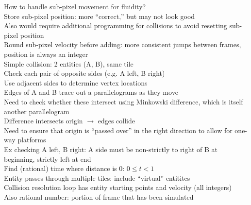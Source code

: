 \documentclass{article}
\begin{document}
How to handle sub-pixel movement for fluidity? \\
Store sub-pixel position: more ``correct,'' but may not look good \\
Also would require additional programming for collisions
to avoid resetting sub-pixel position \\
Round sub-pixel velocity before adding: more consistent jumps between frames,
position is always an integer \\

Simple collision: 2 entities (A, B), same tile \\
Check each pair of opposite sides (e.g. A left, B right) \\
Use adjacent sides to determine vertex locations \\
Edges of A and B trace out a parallelograms as they move \\
Need to check whether these intersect using Minkowski difference,
which is itself another parallelogram \\
Difference intersects origin $\rightarrow$ edges collide \\
Need to ensure that origin is ``passed over'' in the right direction
to allow for one-way platforms \\
Ex checking A left, B right:
A side must be non-strictly to right of B at beginning, strictly left at end \\
Find (rational) time where distance is 0: $0 \leq t < 1$ \\


Entity passes through multiple tiles: include ``virtual'' entitites \\

Collision resolution loop has entity starting points and velocity (all integers) \\
Also rational number: portion of frame that has been simulated \\
\end{document}
